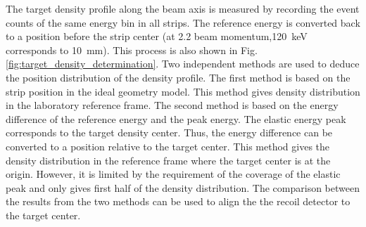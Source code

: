 \documentclass[fleqn,twocolumn,a4paper]{ikpar}
\begin{document}
\par
\medskip

The target density profile along the beam axis is measured by recording the event counts of the same energy bin in all strips.
The reference energy is converted back to a position before the strip center
(at \SI{2.2}{\momentum} beam momentum,\SI{120}{\keV} corresponds to \SI{10}{\mm}).
This process is also shown in Fig.\ref{fig:target_density_determination}.
Two independent methods are used to deduce the position distribution of the density profile.
The first method is based on the strip position in the ideal geometry model.
This method gives density distribution in the laboratory reference frame.
The second method is based on the energy difference of the reference energy and
the peak energy.
The elastic energy peak corresponds to the target density center.
Thus, the energy difference can be converted to a position relative to the target center. 
This method gives the density distribution in the reference frame where the
target center is at the origin.
However, it is limited by the requirement of the coverage of the elastic peak and only gives first half of the density distribution.
The comparison between the results from the two methods can be used to align the the recoil detector to the target center.


\end{document}
